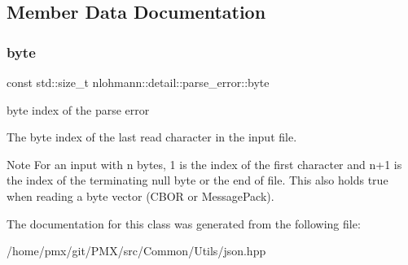 \subsection{Member Data Documentation}
\mbox{\label{classnlohmann_1_1detail_1_1parse__error_a9505aaa1ca943be927eec7cc579592ff}} 
\subsubsection{\texorpdfstring{byte}{byte}}
{\footnotesize\ttfamily const std\+::size\+\_\+t nlohmann\+::detail\+::parse\+\_\+error\+::byte}



byte index of the parse error 

The byte index of the last read character in the input file.

\begin{DoxyNote}{Note}
For an input with n bytes, 1 is the index of the first character and n+1 is the index of the terminating null byte or the end of file. This also holds true when reading a byte vector (C\+B\+OR or Message\+Pack). 
\end{DoxyNote}


The documentation for this class was generated from the following file\+:\begin{DoxyCompactItemize}
\item 
/home/pmx/git/\+P\+M\+X/src/\+Common/\+Utils/json.\+hpp\end{DoxyCompactItemize}
